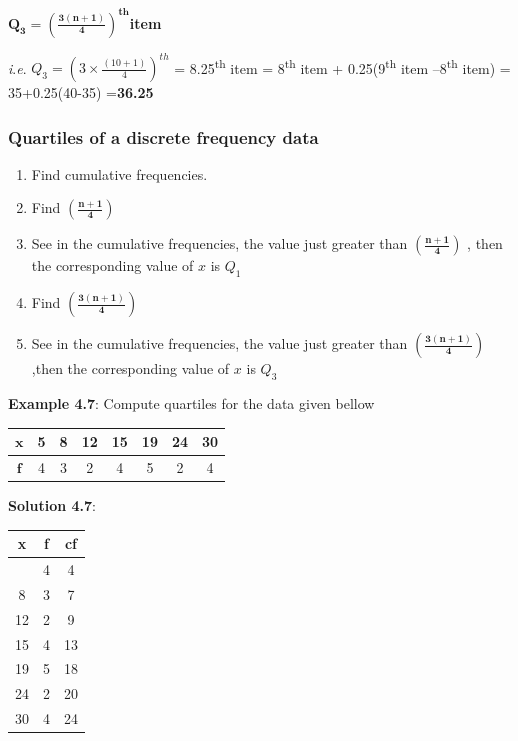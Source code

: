 \documentclass[
]{book}
\begin{document}
\(\mathbf{Q}_{\mathbf{3}}\mathbf{=}\left( \frac{\mathbf{3(n + 1)}}{\mathbf{4}} \right)^{\mathbf{\text{th}}}\)\textbf{item}

\emph{i}.\emph{e}. \(Q_{3} = \left( 3 \times \frac{(10 + 1)}{4} \right)^{th}\) =
8.25\textsuperscript{th} item = 8\textsuperscript{th} item + 0.25(9\textsuperscript{th} item --8\textsuperscript{th} item) =
35+0.25(40-35) =\textbf{36.25}

\hypertarget{quartiles-of-a-discrete-frequency-data}{%
\subsubsection{Quartiles of a discrete frequency data}\label{quartiles-of-a-discrete-frequency-data}}

\begin{enumerate}
\def\labelenumi{\arabic{enumi}.}
\item
  Find cumulative frequencies.
\item
  Find \(\left( \frac{\mathbf{n + 1}}{\mathbf{4}} \right)\)
\item
  See in the cumulative frequencies, the value just greater than
  \(\left( \frac{\mathbf{n + 1}}{\mathbf{4}} \right)\) , then the
  corresponding value of \(x\) is \(Q_{1}\)
\item
  Find \(\left( \frac{\mathbf{3(n + 1)}}{\mathbf{4}} \right)\)
\item
  See in the cumulative frequencies, the value just greater than
  \(\left( \frac{\mathbf{3(n + 1)}}{\mathbf{4}} \right)\) ,then the
  corresponding value of \(x\) is \(Q_{3}\)
\end{enumerate}

\textbf{Example 4.7}: Compute quartiles for the data given bellow

\begin{longtable}[]{@{}cccccccc@{}}
\toprule\noalign{}
\(\mathbf{x}\) & 5 & 8 & 12 & 15 & 19 & 24 & 30 \\
\midrule\noalign{}
\endhead
\bottomrule\noalign{}
\endlastfoot
\(\mathbf{f}\) & 4 & 3 & 2 & 4 & 5 & 2 & 4 \\
\end{longtable}

\textbf{Solution 4.7}:

\begin{longtable}[]{@{}ccc@{}}
\toprule\noalign{}
x & f & cf \\
\midrule\noalign{}
\endhead
\bottomrule\noalign{}
\endlastfoot
5 & 4 & 4 \\
8 & 3 & 7 \\
12 & 2 & 9 \\
15 & 4 & 13 \\
19 & 5 & 18 \\
24 & 2 & 20 \\
30 & 4 & 24 \\
\end{longtable}
\end{document}
